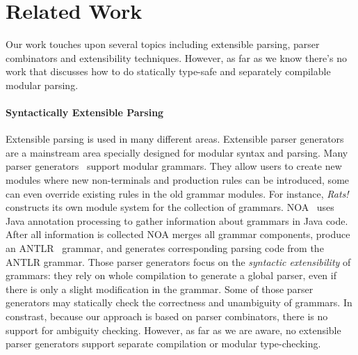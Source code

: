 \section{Related Work}\label{sec:relatedwork}

%
%
%
%

Our work touches upon several topics including extensible parsing,
parser combinators and extensibility techniques. However, as far as we
know there's no work that discusses how to do statically type-safe and
separately compilable modular parsing.

\begin{comment}
There has been a
great amount of related papers on those topics. Some
inspired us of this paper and encourage us for more exploration. This
section will try to lead a discussion on what difference we have made.
\end{comment}

\paragraph{Syntactically Extensible Parsing} Extensible parsing is
used in many different areas. Extensible parser generators are a
mainstream area specially designed for modular syntax and
parsing. Many parser
generators~\cite{antlr1995,Grimm2006,Gouseti2014,Warth2016} support
modular grammars. They allow users to create new modules where new
non-terminals and production rules can be introduced, some can even
override existing rules in the old grammar modules. For instance,
\textit{Rats!}~\cite{Grimm2006} constructs its own module system for
the collection of grammars.  NOA~\cite{Gouseti2014} uses Java
annotation processing to gather information about grammars in Java
code. After all information is collected NOA merges all grammar
components, produce an ANTLR~\cite{antlr1995} grammar, and generates
corresponding parsing code from the ANTLR grammar.  Those parser
generators focus on the \textit{syntactic extensibility} of grammars:
they rely on whole compilation to generate a global parser, even if
there is only a slight modification in the grammar. Some of those
parser generators may statically check the correctness and unambiguity
of grammars. In constrast, because our approach is based on parser
combinators, there is no support for ambiguity checking.  However, as
far as we are aware, no extensible parser generators support separate
compilation or modular type-checking.

